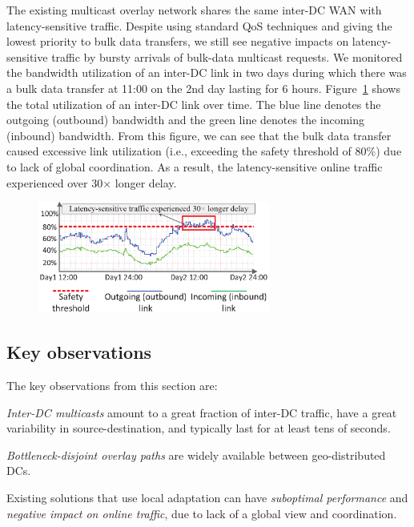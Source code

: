 The existing multicast overlay network shares the same inter-DC WAN
with latency-sensitive traffic.
Despite using standard QoS techniques and giving the lowest priority to
bulk data transfers, we still see negative impacts on
latency-sensitive traffic by bursty arrivals of bulk-data multicast
requests. We monitored the bandwidth utilization of an inter-DC
link in two days during which there was a bulk data transfer at 11:00 on the 2nd day lasting for 6 hours. Figure~\ref{fig:lesson2} shows the total utilization of an inter-DC link over time. The blue line denotes the outgoing (outbound) bandwidth and the green line denotes the incoming (inbound) bandwidth.
From this figure, we can see that the bulk data transfer caused excessive link utilization (i.e., exceeding the safety threshold of 80\%) due
to lack of global coordination. As a result, the latency-sensitive online traffic experienced over
30$\times$ longer delay.



\begin{figure}[t!]
        \center
        \includegraphics[width=3in]{images/nj02-M2A_0212-0216_v3.eps}
        \label{fig:lesson2}
\vspace{-0.1in}
\end{figure}

\subsection{Key observations}
The key observations from this section are:
\begin{packeditemize}
\item {\em Inter-DC multicasts} amount to a
great fraction of inter-DC traffic,
have a great variability in source-destination, and typically last for at
least tens of seconds.
\item {\em Bottleneck-disjoint overlay paths} are widely available
between geo-distributed DCs.
\item Existing solutions that use local adaptation
can have {\em suboptimal performance} and {\em negative impact on
online traffic}, due to lack of a global view and coordination.
\end{packeditemize}

